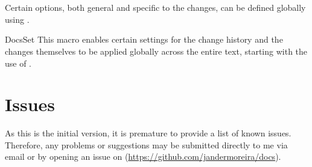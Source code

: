 \documentclass[11pt, outdir = ./out]{article}
\begin{document}
\begin{DocsListing}
\end{DocsListing}


\section{}

Certain options, both general and specific to the changes, can be defined globally using .

\begin{Macrodef}{DocsSet}{}{}
    This macro enables certain settings for the change history and the changes themselves to be applied globally across the entire text, starting with the use of .
\end{Macrodef}

\begin{DocsListing}
\end{DocsListing}


\section{Issues}

As this is the initial version, it is premature to provide a list of known issues. Therefore, any problems or suggestions may be submitted directly to me via email or by opening an issue on  (\url{https://github.com/jandermoreira/docs}).

\printindex
\end{document}
